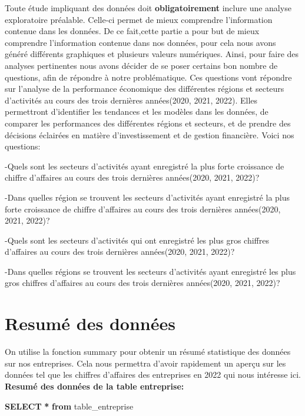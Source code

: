 \documentclass[mstat,12pt]{unswthesis}
\newenvironment{Shaded}{\begin{snugshade}}{\end{snugshade}}
\newcommand{\KeywordTok}[1]{\textcolor[rgb]{0.13,0.29,0.53}{\textbf{#1}}}
\newcommand{\NormalTok}[1]{#1}
\newcommand{\OperatorTok}[1]{\textcolor[rgb]{0.81,0.36,0.00}{\textbf{#1}}}
\begin{document}
Toute étude impliquant des données doit \textbf{obligatoirement} inclure
une analyse exploratoire préalable. Celle-ci permet de mieux comprendre
l'information contenue dans les données. De ce fait,cette partie a pour
but de mieux comprendre l'information contenue dans nos données, pour
cela nous avons généré différents graphiques et plusieurs valeurs
numériques. Ainsi, pour faire des analyses pertinentes nous avons
décider de se poser certains bon nombre de questions, afin de répondre à
notre problématique. Ces questions vont répondre sur l'analyse de la
performance économique des différentes régions et secteurs d'activités
au cours des trois dernières années(2020, 2021, 2022). Elles permettront
d'identifier les tendances et les modèles dans les données, de comparer
les performances des différentes régions et secteurs, et de prendre des
décisions éclairées en matière d'investissement et de gestion
financière. Voici nos questions:

-Quels sont les secteurs d'activités ayant enregistré la plus forte
croissance de chiffre d'affaires au cours des trois dernières
années(2020, 2021, 2022)?

-Dans quelles région se trouvent les secteurs d'activités ayant
enregistré la plus forte croissance de chiffre d'affaires au cours des
trois dernières années(2020, 2021, 2022)?

-Quels sont les secteurs d'activités qui ont enregistré les plus gros
chiffres d'affaires au cours des trois dernières années(2020, 2021,
2022)?

-Dans quelles régions se trouvent les secteurs d'activités ayant
enregistré les plus gros chiffres d'affaires au cours des trois
dernières années(2020, 2021, 2022)?

\hypertarget{resumuxe9-des-donnuxe9es}{%
\section{\texorpdfstring{\textbf{Resumé des
données}}{Resumé des données}}\label{resumuxe9-des-donnuxe9es}}

On utilise la fonction summary pour obtenir un résumé statistique des
données sur nos entreprises. Cela nous permettra d'avoir rapidement un
aperçu sur les données tel que les chiffres d'affaires des entreprises
en 2022 qui nous intéresse ici. \medskip \textbf{Resumé des données de
la table entreprise:} \medskip

\bigskip

\begin{Shaded}
\begin{Highlighting}[]
\KeywordTok{SELECT} \OperatorTok{*} 
\KeywordTok{from}\NormalTok{ table\_entreprise}
\end{Highlighting}
\end{Shaded}
\end{document}
